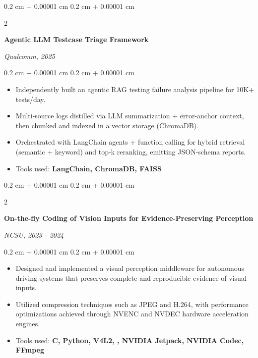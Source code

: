 \documentclass[10pt, letterpaper]{article}
\newenvironment{highlights}{
    \begin{itemize}[
        topsep=0.10 cm,
        parsep=0.10 cm,
        partopsep=0pt,
        itemsep=0pt,
        leftmargin=0.4 cm + 10pt
    ]
}{
    \end{itemize}
} %
\newenvironment{onecolentry}{
    \begin{adjustwidth}{
        0.2 cm + 0.00001 cm
    }{
        0.2 cm + 0.00001 cm
    }
}{
    \end{adjustwidth}
} %
\newenvironment{twocolentry}[2][]{
    \onecolentry
    \def\secondColumn{#2}
    \setcolumnwidth{\fill, 4.5 cm}
    \begin{paracol}{2}
}{
    \switchcolumn \raggedleft \secondColumn
    \end{paracol}
    \endonecolentry
} %
\begin{document}
        \begin{twocolentry}{

        \textit{Qualcomm, 2025}}
            \textbf{Agentic LLM Testcase Triage Framework}
        \end{twocolentry}

        \vspace{0.10 cm}
        \begin{onecolentry}
            \begin{highlights}
                \item Independently built an agentic RAG testing failure analysis pipeline for 10K+ tests/day.
                \item Multi-source logs distilled via LLM summarization + error-anchor context, then chunked and indexed in a vector storage (ChromaDB). 
                \item Orchestrated with LangChain agents + function calling for hybrid retrieval (semantic + keyword) and top-k reranking, emitting JSON-schema reports.
                \item Tools used: \textbf{LangChain, ChromaDB, FAISS}
            \end{highlights}
        \end{onecolentry}


        \vspace{0.15 cm}
            
        \begin{twocolentry}{
            
            
        \textit{NCSU, 2023 - 2024}}
            \textbf{On-the-fly Coding of Vision Inputs for Evidence-Preserving Perception}
        \end{twocolentry}

        \vspace{0.10 cm}
        \begin{onecolentry}
            \begin{highlights}
                \item Designed and implemented a visual perception middleware for autonomous driving systems that preserves complete and reproducible evidence of visual inputs.
                \item Utilized compression techniques such as JPEG and H.264, with performance optimizations achieved through NVENC and NVDEC hardware acceleration engines. 
                \item Tools used: \textbf{C, Python, V4L2, , NVIDIA Jetpack, NVIDIA Codec, FFmpeg}
            \end{highlights}
        \end{onecolentry}
\end{document}
